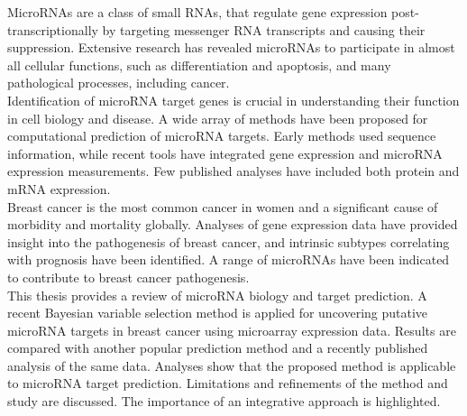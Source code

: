 \documentclass[english,12pt,a4paper,pdftex,elec,utf8]{aaltothesis}
\begin{document}
\begin{abstractpage}[english]

MicroRNAs are a class of small RNAs, that regulate gene expression
post-transcriptionally by targeting messenger RNA transcripts and causing their
suppression. Extensive research has revealed microRNAs to participate in
almost all cellular functions, such as differentiation and apoptosis, and
many pathological processes, including cancer. \\

Identification of microRNA target genes is crucial in understanding their
function in cell biology and disease. A wide array of methods have been
proposed for computational prediction of microRNA targets. Early methods used
sequence information, while recent tools have integrated gene expression
and microRNA expression measurements. Few published analyses have
included both protein and mRNA expression. \\

Breast cancer is the most common cancer in women and a significant cause of
morbidity and mortality globally. Analyses of gene expression data have
provided insight into the pathogenesis of breast cancer, and intrinsic subtypes
correlating with prognosis have been identified. A range of microRNAs have been
indicated to contribute to breast cancer pathogenesis. \\

This thesis provides a review of microRNA biology and target prediction. A
recent Bayesian variable selection method is applied for uncovering putative
microRNA targets in breast cancer using microarray expression data. Results
are compared with another popular prediction method and a recently published
analysis of the same data. Analyses show that the proposed method is
applicable to microRNA target prediction. Limitations and refinements of the
method and study are discussed. The importance of an integrative approach is
highlighted.

\end{abstractpage}

\newpage
\end{document}
